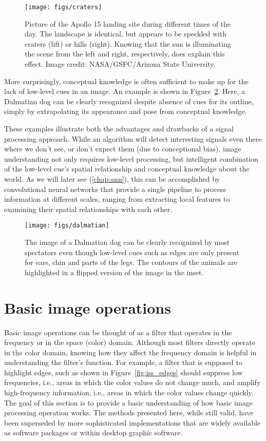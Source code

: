 \begin{figure}[!htb]
    \centering
    \texttt{[image: figs/craters]}
    \caption{Picture of the Apollo 15 landing site during different times of the day. The landscape is identical, but appears to be speckled with craters (lift) or hills (right). Knowing that the sun is illuminating the scene from the left and right, respectively, does explain this effect. Image credit: NASA/GSFC/Arizona State University.
    \label{fig:craters}}
\end{figure}

More surprisingly, conceptual knowledge is often sufficient to make up for the lack of low-level cues in an image. An example is shown in Figure~\ref{fig:dalmatian}. Here, a Dalmatian dog can be clearly recognized despite absence of cues for its outline, simply by extrapolating its appearance and pose from conceptual knowledge.

These examples illustrate both the advantages and drawbacks of a signal processing approach. While an algorithm will detect interesting signals even there where we don't see, or don't expect them (due to conceptional bias), image understanding not only requires low-level processing, but intelligent combination of the low-level cue's spatial relationship and conceptual knowledge about the world. As we will later see (\cref{chap:ann}), this can be accomplished by convolutional neural networks that provide a single pipeline to process information at different scales, ranging from extracting local features to examining their spatial relationships with each other. 


\begin{figure}
    \centering
    \texttt{[image: figs/dalmatian]}
    \caption{The image of a Dalmatian dog can be clearly recognized by most spectators even though low-level cues such as edges are only present for ears, chin and parts of the legs. The contours of the animals are highlighted in a flipped version of the image in the inset.
    \label{fig:dalmatian}}
\end{figure}



\section{Basic image operations}
Basic image operations can be thought of as a filter that operates in the frequency or in the space (color) domain. Although most filters directly operate in the color domain, knowing how they affect the frequency domain is helpful in understanding the filter's function. For example, a filter that is supposed to highlight edges, such as shown in Figure~\ref{fig:iss_edges} should suppress low frequencies, i.e., areas in which the color values do not change much, and amplify high-frequency information, i.e., areas in which the color values change quickly. The goal of this section is to provide a basic understanding of how basic image processing operation works. The methods presented here, while still valid, have been superseded by more sophisticated implementations that are widely available as software packages or within desktop graphic software.

